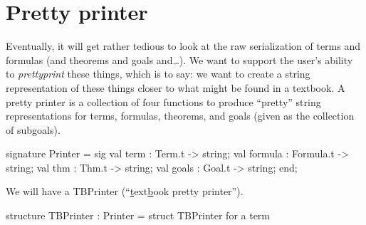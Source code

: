 
\section{Pretty printer}

\begin{node}
Eventually, it will get rather tedious to look at the raw serialization of
terms and formulas (and theorems and goals and\dots). We want to
support the user's ability to \emph{prettyprint} these things, which
is to say: we want to create a string representation of these things
closer to what might be found in a textbook. A pretty printer is a
collection of four functions to produce ``pretty'' string
representations for terms, formulas, theorems, and goals (given as the
collection of subgoals).
\end{node}

\nwenddocs{}\endmoddef\nwstartdeflinemarkup\nwenddeflinemarkup
signature Printer = sig
  val term : Term.t -> string;
  val formula : Formula.t -> string;
  val thm : Thm.t -> string;
  val goals : Goal.t -> string;
end;
\nwendcode{}\nwdocspar

\begin{node}
We will have a {\Tt{}TBPrinter\nwendquote} (``\underline{t}ext\underline{b}ook
pretty printer'').
\end{node}

\nwenddocs{}\endmoddef\nwstartdeflinemarkup\nwenddeflinemarkup
structure TBPrinter : Printer = struct
\LA{}TBPrinter for a term~{\nwtagstyle{}}\RA{}

